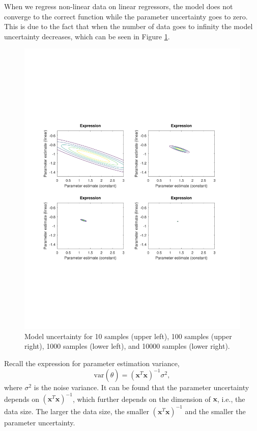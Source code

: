 \documentclass[]{article}
\begin{document}
When we regress non-linear data on linear regressors, the model does not converge to the correct function while the parameter uncertainty goes to zero. This is due to the fact that when the number of data goes to infinity the model uncertainty decreases, which can be seen in Figure \ref{fig:uncertainty_lim}. 
\begin{figure}[ht]
	\centering
	\includegraphics[trim= 10cm 5cm 10cm 5cm, scale=0.4]{proj1-3_2a}
	\caption{Model uncertainty for 10 samples (upper left), 100 samples (upper right), 1000 samples (lower left), and 10000 samples (lower right).}
	\label{fig:uncertainty_lim}
\end{figure}
Recall the expression for parameter estimation variance,
\begin{equation}
\text{var}(\hat{\theta}) = (\mathbf{x}^T\mathbf{x})^{-1}\sigma^2,
\end{equation}
where $\sigma^2$ is the noise variance. It can be found that the parameter uncertainty depends on $(\mathbf{x}^T\mathbf{x})^{-1}$, which further depends on the dimension of $\mathbf{x}$, i.e., the data size. The larger the data size, the smaller $(\mathbf{x}^T\mathbf{x})^{-1}$ and the smaller the parameter uncertainty. 
\end{document}
